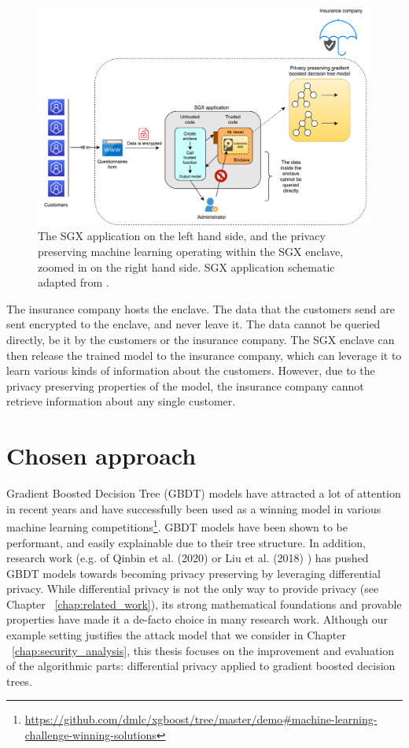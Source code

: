 \begin{figure}[h!]
	\center
	\includegraphics[scale=0.75]{images/introduction/big_picture}
	\caption{\label{fig:big_picture} The SGX application on the left hand side, and the privacy preserving machine learning operating within the SGX enclave, zoomed in on the right hand side. SGX application schematic adapted from \cite{sgx_fig}.}
\end{figure}

The insurance company hosts the enclave. The data that the customers send are sent encrypted to the enclave, and never leave it. The data cannot be queried directly, be it by the customers or the insurance company. The SGX enclave can then release the trained model to the insurance company, which can leverage it to learn various kinds of information about the customers. However, due to the privacy preserving properties of the model, the insurance company cannot retrieve information about any single customer.



\section{Chosen approach}

Gradient Boosted Decision Tree (GBDT) models have attracted a lot of attention in recent years and have successfully been used as a winning model in various machine learning competitions\footnote{\href{https://github.com/dmlc/xgboost/tree/master/demo\#machine-learning-challenge-winning-solutions}{https://github.com/dmlc/xgboost/tree/master/demo\#machine-learning-challenge-winning-solutions}}. GBDT models have been shown to be performant, and easily explainable due to their tree structure. In addition, research work (e.g. of Qinbin et al. (2020) \cite{dpgbdt} or Liu et al. (2018) \cite{liu}) has pushed GBDT models towards becoming privacy preserving by leveraging differential privacy. While differential privacy is not the only way to provide privacy (see Chapter ~\ref{chap:related_work}), its strong mathematical foundations and provable properties have made it a de-facto choice in many research work. Although our example setting justifies the attack model that we consider in Chapter ~\ref{chap:security_analysis}, this thesis focuses on the improvement and evaluation of the algorithmic parts: differential privacy applied to gradient boosted decision trees.

